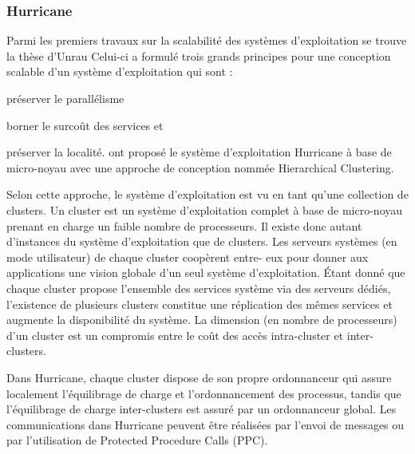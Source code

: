       
    \subsubsection{Hurricane}

      Parmi les premiers travaux sur la scalabilité des systèmes d’exploitation
      se trouve la thèse d’Unrau Celui-ci a formulé trois grands principes pour
      une conception scalable d’un système d’exploitation qui sont :
      \benumline \item préserver le parallélisme \item borner le surcoût des
      services et \item préserver la
      localité\eenumline. \citet{unrau1995hierarchical} ont proposé le système
      d’exploitation Hurricane à base de micro-noyau avec une approche de
      conception nommée Hierarchical Clustering.

      Selon cette approche, le système d’exploitation est vu en tant qu’une
      collection de clusters. Un cluster est un système d’exploitation complet
      à base de micro-noyau prenant en charge un faible nombre de
      processeurs. Il existe donc autant d’instances du système d’exploitation
      que de clusters. Les serveurs systèmes (en mode utilisateur) de chaque
      cluster coopèrent entre- eux pour donner aux applications une vision
      globale d’un seul système d’exploitation. Étant donné que chaque cluster
      propose l’ensemble des services système via des serveurs dédiés,
      l’existence de plusieurs clusters constitue une réplication des mêmes
      services et augmente la disponibilité du système. La dimension (en nombre
      de processeurs) d’un cluster est un compromis entre le coût des accès
      intra-cluster et inter-clusters.

      Dans Hurricane, chaque cluster dispose de son propre ordonnanceur qui
      assure localement l’équilibrage de charge et l'ordonnancement des
      processus, tandis que l’équilibrage de charge inter-clusters est assuré
      par un ordonnanceur global. Les communications dans Hurricane peuvent être
      réalisées par l’envoi de messages ou par l’utilisation de Protected
      Procedure Calls (PPC).

